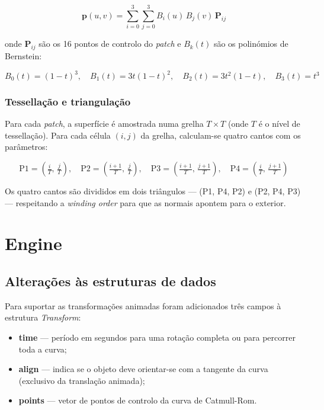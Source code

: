 \documentclass[12pt,a4paper]{article}
\begin{document}
\begin{equation}
    \mathbf{p}(u,v) = \sum_{i=0}^{3} \sum_{j=0}^{3} B_i(u)\, B_j(v)\, \mathbf{P}_{ij}
\end{equation}

onde $\mathbf{P}_{ij}$ são os 16 pontos de controlo do \textit{patch} e $B_k(t)$ são os polinómios de Bernstein:

\begin{equation}
    B_0(t) = (1-t)^3, \quad
    B_1(t) = 3t(1-t)^2, \quad
    B_2(t) = 3t^2(1-t), \quad
    B_3(t) = t^3
\end{equation}

\subsubsection{Tessellação e triangulação}

Para cada \textit{patch}, a superfície é amostrada numa grelha $T \times T$ (onde $T$ é o nível de tessellação). Para cada célula $(i,j)$ da grelha, calculam-se quatro cantos com os parâmetros:

\begin{equation}
    \text{P1} = \left(\tfrac{i}{T},\, \tfrac{j}{T}\right), \quad
    \text{P2} = \left(\tfrac{i+1}{T},\, \tfrac{j}{T}\right), \quad
    \text{P3} = \left(\tfrac{i+1}{T},\, \tfrac{j+1}{T}\right), \quad
    \text{P4} = \left(\tfrac{i}{T},\, \tfrac{j+1}{T}\right)
\end{equation}

Os quatro cantos são divididos em dois triângulos — (P1, P4, P2) e (P2, P4, P3) — respeitando a \textit{winding order} para que as normais apontem para o exterior.

\section{Engine}

\subsection{Alterações às estruturas de dados}

Para suportar as transformações animadas foram adicionados três campos à estrutura \textit{Transform}:

\begin{itemize}
    \item \textbf{time} — período em segundos para uma rotação completa ou para percorrer toda a curva;
    \item \textbf{align} — indica se o objeto deve orientar-se com a tangente da curva (exclusivo da translação animada);
    \item \textbf{points} — vetor de pontos de controlo da curva de Catmull-Rom.
\end{itemize}
\end{document}
